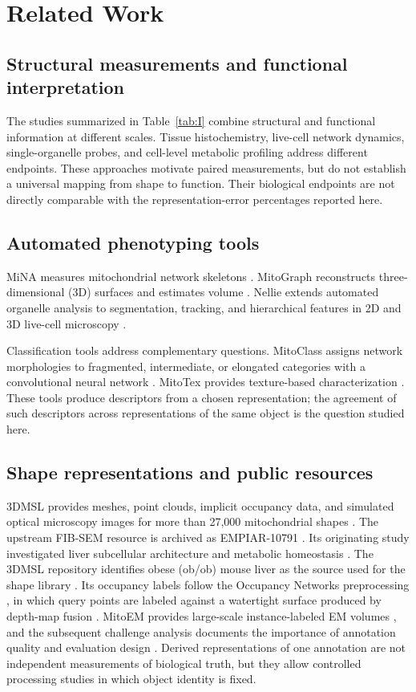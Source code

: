 \documentclass[journal]{IEEEtran}
\begin{document}
\section{Related Work}

\subsection{Structural measurements and functional interpretation}

The studies summarized in Table~\ref{tab:I} combine structural and functional information at different scales. Tissue histochemistry, live-cell network dynamics, single-organelle probes, and cell-level metabolic profiling address different endpoints. These approaches motivate paired measurements, but do not establish a universal mapping from shape to function. Their biological endpoints are not directly comparable with the representation-error percentages reported here.

\subsection{Automated phenotyping tools}

MiNA measures mitochondrial network skeletons \cite{ref31}. MitoGraph reconstructs three-dimensional (3D) surfaces and estimates volume \cite{ref32}. Nellie extends automated organelle analysis to segmentation, tracking, and hierarchical features in 2D and 3D live-cell microscopy \cite{ref33}.

Classification tools address complementary questions. MitoClass assigns network morphologies to fragmented, intermediate, or elongated categories with a convolutional neural network \cite{ref9}. MitoTex provides texture-based characterization \cite{ref10}. These tools produce descriptors from a chosen representation; the agreement of such descriptors across representations of the same object is the question studied here.

\subsection{Shape representations and public resources}

3DMSL provides meshes, point clouds, implicit occupancy data, and simulated optical microscopy images for more than 27,000 mitochondrial shapes \cite{ref11}. The upstream FIB-SEM resource is archived as EMPIAR-10791 \cite{ref13}. Its originating study investigated liver subcellular architecture and metabolic homeostasis \cite{ref14}. The 3DMSL repository identifies obese (ob/ob) mouse liver as the source used for the shape library \cite{ref20}. Its occupancy labels follow the Occupancy Networks preprocessing \cite{ref21}, in which query points are labeled against a watertight surface produced by depth-map fusion \cite{ref22}. MitoEM provides large-scale instance-labeled EM volumes \cite{ref15}, and the subsequent challenge analysis documents the importance of annotation quality and evaluation design \cite{ref16}. Derived representations of one annotation are not independent measurements of biological truth, but they allow controlled processing studies in which object identity is fixed.
\end{document}
